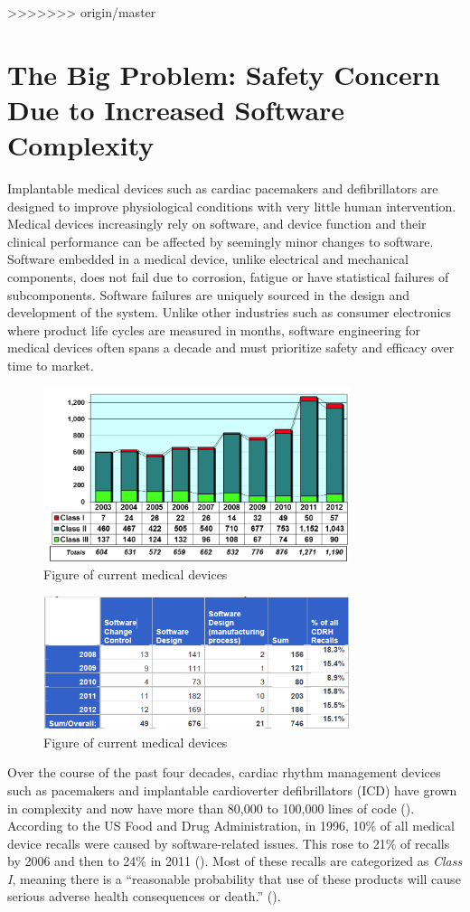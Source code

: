 >>>>>>> origin/master
\section{The Big Problem: Safety Concern Due to Increased Software Complexity}
Implantable medical devices such as cardiac pacemakers and defibrillators are designed to improve physiological conditions with very little human intervention. 
 Medical devices increasingly rely on software, and device function and their clinical performance can be affected by seemingly minor changes to software. Software embedded in a medical device, unlike electrical and mechanical components, does not fail due to corrosion, fatigue or have statistical failures of subcomponents. Software failures are uniquely sourced in the design and development of the system. Unlike other industries such as consumer electronics where product life cycles are measured in months, software engineering for medical devices often spans a decade and must prioritize safety and efficacy over time to market. 
\begin{figure}[t]
		\centering
		\includegraphics[width=0.8\textwidth]{figs/recalls.jpg}
		\caption{\small Figure of current medical devices}
		\label{fig:Cur}
\end{figure}
\begin{figure}[t]
		\centering
		\includegraphics[width=0.8\textwidth]{figs/soft_recalls.jpg}
		\caption{\small Figure of current medical devices}
		\label{fig:Cur}
\end{figure}
  Over the course of the past four decades, cardiac rhythm management devices such as pacemakers and implantable cardioverter defibrillators (ICD) have grown in complexity and now have more than 80,000 to 100,000 lines of code (\cite{pauljones}). According to the US Food and Drug Administration, in 1996, 10\% of all medical device recalls were caused by software-related issues. This rose to 21\% of recalls by 2006 and then to 24\% in 2011 (\cite{medstats}). Most of these recalls are categorized as \emph{Class I}, meaning there is a ``reasonable probability that use of these products will cause serious adverse health consequences or death.'' (\cite{medstats2,pacemakerrecalls,killedbycode}). 
	
